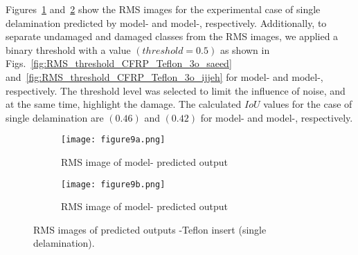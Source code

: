 Figures~\ref{fig:RMS_CFRP_Teflon_3o_saeed} and~\ref{fig:RMS_CFRP_Teflon_3o_ijjeh} show the RMS images for the experimental case of single delamination predicted by model- and model-, respectively.
Additionally, to separate undamaged and damaged classes from the RMS images, we applied a binary threshold with a value \((threshold=0.5)\) as shown in Figs.~\ref{fig:RMS_threshold_CFRP_Teflon_3o_saeed} and~\ref{fig:RMS_threshold_CFRP_Teflon_3o_ijjeh} for model- and model-, respectively. 
The threshold level was selected to limit the influence of noise, and at the same time, highlight the damage.
The calculated \(IoU\) values for the case of single delamination are \((0.46)\) and \((0.42)\) for model- and model-, respectively.
\begin{figure} [!h]
	\begin{subfigure}[b]{.48\textwidth}
		\centering
		\texttt{[image: figure9a.png]}
		\caption{RMS image of model- predicted output}
		\label{fig:RMS_CFRP_Teflon_3o_saeed}
	\end{subfigure}
	\hfill
	\begin{subfigure}[b]{.48\textwidth}
		\centering
		\texttt{[image: figure9b.png]}
		\caption{RMS image of model- predicted output} 
		\label{fig:RMS_CFRP_Teflon_3o_ijjeh}
	\end{subfigure}
	\caption{RMS images of predicted outputs -Teflon insert (single delamination).}
	\label{fig:RMS_CFRP_Teflon_3o_images}
\end{figure} 
